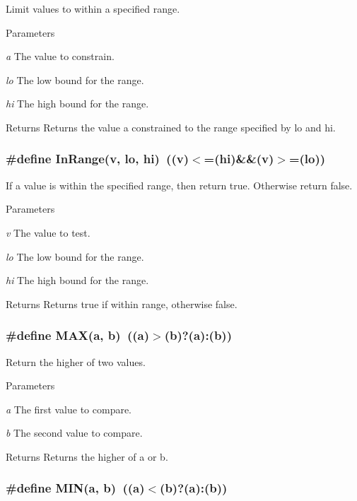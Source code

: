 Limit values to within a specified range. 
\begin{DoxyParams}{Parameters}
\item[{\em a}]The value to constrain. \item[{\em lo}]The low bound for the range. \item[{\em hi}]The high bound for the range. \end{DoxyParams}
\begin{DoxyReturn}{Returns}
Returns the value a constrained to the range specified by lo and hi. 
\end{DoxyReturn}
\hypertarget{group__misc_ga1a07879e1cf90ff22dbd52a5408986dd}{
\subsubsection[{InRange}]{\setlength{\rightskip}{0pt plus 5cm}\#define InRange(v, \/  lo, \/  hi)~((v)$<$=(hi)\&\&(v)$>$=(lo))}}
\label{group__misc_ga1a07879e1cf90ff22dbd52a5408986dd}


If a value is within the specified range, then return true. Otherwise return false.


\begin{DoxyParams}{Parameters}
\item[{\em v}]The value to test. \item[{\em lo}]The low bound for the range. \item[{\em hi}]The high bound for the range. \end{DoxyParams}
\begin{DoxyReturn}{Returns}
Returns true if within range, otherwise false. 
\end{DoxyReturn}
\hypertarget{group__misc_gafa99ec4acc4ecb2dc3c2d05da15d0e3f}{
\subsubsection[{MAX}]{\setlength{\rightskip}{0pt plus 5cm}\#define MAX(a, \/  b)~((a)$>$(b)?(a):(b))}}
\label{group__misc_gafa99ec4acc4ecb2dc3c2d05da15d0e3f}


Return the higher of two values. 
\begin{DoxyParams}{Parameters}
\item[{\em a}]The first value to compare. \item[{\em b}]The second value to compare. \end{DoxyParams}
\begin{DoxyReturn}{Returns}
Returns the higher of a or b. 
\end{DoxyReturn}
\hypertarget{group__misc_ga3acffbd305ee72dcd4593c0d8af64a4f}{
\subsubsection[{MIN}]{\setlength{\rightskip}{0pt plus 5cm}\#define MIN(a, \/  b)~((a)$<$(b)?(a):(b))}}
\label{group__misc_ga3acffbd305ee72dcd4593c0d8af64a4f}


